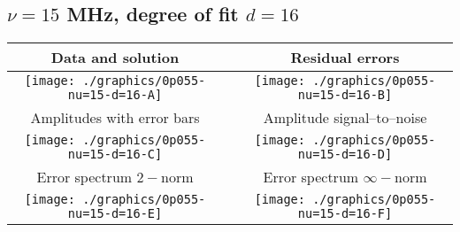 

% 

\clearpage{}
\break{}

\subsection{$\nu = 15$ MHz, degree of fit $d = 16$}

\begin{table}[h]
    \begin{center}
        \begin{tabular}{ccc}
            Data and solution & \quad & Residual errors \\\hline
            \texttt{[image: ./graphics/0p055-nu=15-d=16-A]} &&
            \texttt{[image: ./graphics/0p055-nu=15-d=16-B]} \\[15pt]
            Amplitudes with error bars && Amplitude signal--to--noise \\\hline
            \texttt{[image: ./graphics/0p055-nu=15-d=16-C]} &&
            \texttt{[image: ./graphics/0p055-nu=15-d=16-D]} \\[15pt]
            Error spectrum $2-$norm && Error spectrum $\infty-$norm \\\hline
            \texttt{[image: ./graphics/0p055-nu=15-d=16-E]} &&
            \texttt{[image: ./graphics/0p055-nu=15-d=16-F]} \\[15pt]
        \end{tabular}
    \end{center}
\label{fig:elev=55, nu=15}
\end{table}



\endinput
